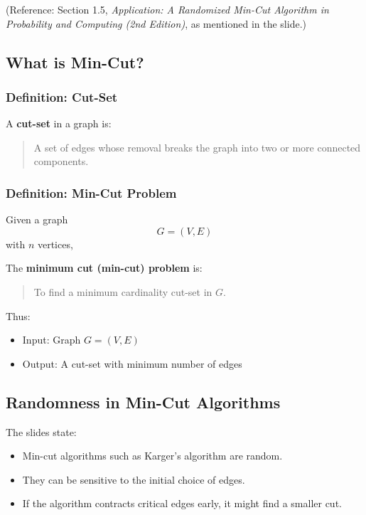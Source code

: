 \documentclass[12pt]{article}
\begin{document}
(Reference: Section 1.5, \textit{Application: A Randomized Min-Cut Algorithm in Probability and Computing (2nd Edition)}, as mentioned in the slide.)

\subsection{What is Min-Cut?}

\subsubsection*{Definition: Cut-Set}

A \textbf{cut-set} in a graph is:

\begin{quote}
A set of edges whose removal breaks the graph into two or more connected components.
\end{quote}

\subsubsection*{Definition: Min-Cut Problem}

Given a graph
\[
G = (V, E)
\]
with $n$ vertices,

The \textbf{minimum cut (min-cut) problem} is:

\begin{quote}
To find a minimum cardinality cut-set in $G$.
\end{quote}

Thus:

\begin{itemize}
    \item Input: Graph $G = (V, E)$
    \item Output: A cut-set with minimum number of edges
\end{itemize}

\subsection{Randomness in Min-Cut Algorithms}

The slides state:

\begin{itemize}
    \item Min-cut algorithms such as Karger’s algorithm are random.
    \item They can be sensitive to the initial choice of edges.
    \item If the algorithm contracts critical edges early, it might find a smaller cut.
\end{itemize}
\end{document}
